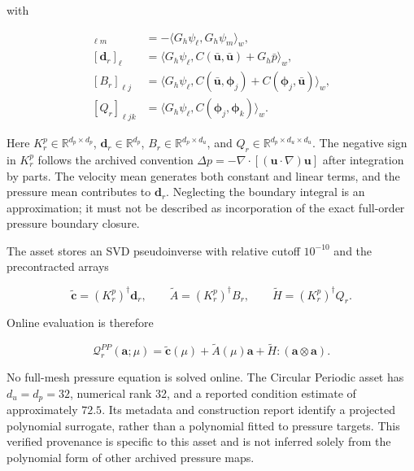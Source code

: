 \documentclass{article}
\begin{document}
with


\begin{align}
 [K_r^p]_{\ell m}&=-\langle G_h\psi_\ell,G_h\psi_m\rangle_w,
 \label{eq:app_ppe_K_definition}\\
 [\bm d_r]_\ell&=\langle G_h\psi_\ell,C(\bar{\bm u},\bar{\bm u})+G_h\bar p\rangle_w,
 \label{eq:app_ppe_d_definition}\\
 [B_r]_{\ell j}&=\langle G_h\psi_\ell,C(\bar{\bm u},\bm\phi_j)+C(\bm\phi_j,\bar{\bm u})\rangle_w,
 \label{eq:app_ppe_B_definition}\\
 [Q_r]_{\ell jk}&=\langle G_h\psi_\ell,C(\bm\phi_j,\bm\phi_k)\rangle_w.
 \label{eq:app_ppe_Q_definition}
\end{align}


Here $K_r^p\in\mathbb R^{d_p\times d_p}$, $\bm d_r\in\mathbb R^{d_p}$, $B_r\in\mathbb R^{d_p\times d_u}$, and $Q_r\in\mathbb R^{d_p\times d_u\times d_u}$. The negative sign in $K_r^p$ follows the archived convention $\Delta p=-\nabla\cdot[(\bm u\cdot\nabla)\bm u]$ after integration by parts. The velocity mean generates both constant and linear terms, and the pressure mean contributes to $\bm d_r$. Neglecting the boundary integral is an approximation; it must not be described as incorporation of the exact full-order pressure boundary closure.

The asset stores an SVD pseudoinverse with relative cutoff $10^{-10}$ and the precontracted arrays


\begin{equation}
 \widetilde{\bm c}=(K_r^p)^\dagger\bm d_r,\qquad
 \widetilde A=(K_r^p)^\dagger B_r,\qquad
 \widetilde H=(K_r^p)^\dagger Q_r.
\end{equation}


Online evaluation is therefore


\begin{equation}
 \mathcal Q_r^{PP}(\bm a;\mu)
 =\widetilde{\bm c}(\mu)+\widetilde A(\mu)\bm a+
   \widetilde H:(\bm a\otimes\bm a).
 \label{eq:app_pressure_poisson_map}
\end{equation}


No full-mesh pressure equation is solved online. The Circular Periodic asset has $d_u=d_p=32$, numerical rank 32, and a reported condition estimate of approximately $72.5$. Its metadata and construction report identify a projected polynomial surrogate, rather than a polynomial fitted to pressure targets. This verified provenance is specific to this asset and is not inferred solely from the polynomial form of other archived pressure maps.
\end{document}
